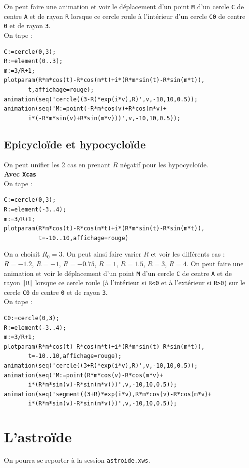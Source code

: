 \documentclass[a4paper,11pt]{book}
\begin{document}
On peut faire une animation et voir le d\'eplacement d'un point {\tt M}
d'un cercle {\tt C} de centre {\tt A} et de rayon {\tt R} lorsque ce cercle 
roule \`a l'int\'erieur d'un cercle {\tt C0} de centre {\tt 0} et de rayon 
{\tt 3}.\\
On tape :
\begin{verbatim}
C:=cercle(0,3);
R:=element(0..3);
m:=3/R+1;
plotparam(R*m*cos(t)-R*cos(m*t)+i*(R*m*sin(t)-R*sin(m*t)),
       t,affichage=rouge);
animation(seq('cercle((3-R)*exp(i*v),R)',v,-10,10,0.5));
animation(seq('M:=point(-R*m*cos(v)+R*cos(m*v)+
       i*(-R*m*sin(v)+R*sin(m*v)))',v,-10,10,0.5));
\end{verbatim}
\subsection{Epicyclo\"ide et hypocyclo\"ide}
On peut unifier les 2 cas en prenant $R$ n\'egatif pour les hypocyclo\"ide.\\
{\bf Avec {\tt Xcas}}\\
On tape :\\
\begin{verbatim}
C:=cercle(0,3);
R:=element(-3..4);
m:=3/R+1;
plotparam(R*m*cos(t)-R*cos(m*t)+i*(R*m*sin(t)-R*sin(m*t)),
          t=-10..10,affichage=rouge)
\end{verbatim}
On a choisit $R_0=3$. On peut ainsi faire varier $R$ et voir les diff\'erents 
cas :\\
 $R=-1.2$, $R=-1$, $R=-0.75$, $R=1$, $R=1.5$, $R=3$, $R=4$.
On peut faire une animation et voir le d\'eplacement d'un point {\tt M}
d'un cercle {\tt C} de centre {\tt A} et de rayon {\tt |R|} lorsque ce cercle 
roule (\`a l'int\'erieur si {\tt R<0} et \`a l'ext\'erieur si {\tt R>0})
sur le cercle {\tt C0} de centre {\tt 0} et de rayon {\tt 3}.\\
On tape :
\begin{verbatim}
C0:=cercle(0,3);
R:=element(-3..4);
m:=3/R+1;
plotparam(R*m*cos(t)-R*cos(m*t)+i*(R*m*sin(t)-R*sin(m*t)),
       t=-10..10,affichage=rouge);
animation(seq('cercle((3+R)*exp(i*v),R)',v,-10,10,0.5));
animation(seq('M:=point(R*m*cos(v)-R*cos(m*v)+
       i*(R*m*sin(v)-R*sin(m*v)))',v,-10,10,0.5));
animation(seq('segment((3+R)*exp(i*v),R*m*cos(v)-R*cos(m*v)+
       i*(R*m*sin(v)-R*sin(m*v)))',v,-10,10,0.5));
\end{verbatim}
\section{L'astro\"ide}
On pourra se reporter \`a la session {\tt astroide.xws}.\\
\end{document}
